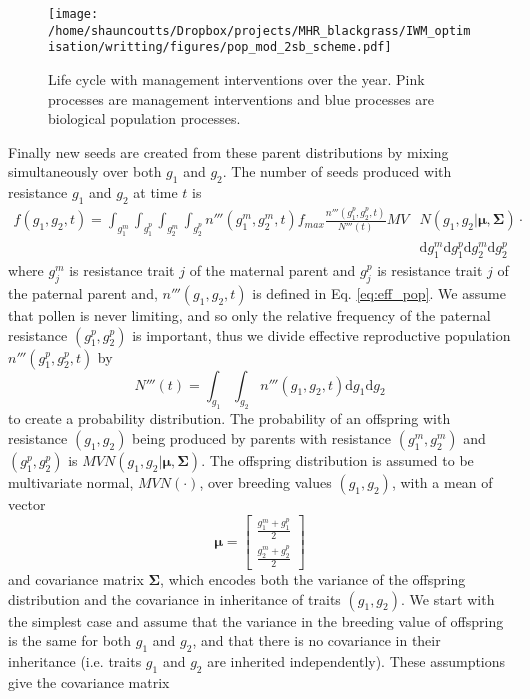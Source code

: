 \documentclass[12pt, a4paper]{article}
\begin{document}
\begin{figure}[H]
\texttt{[image: /home/shauncoutts/Dropbox/projects/MHR\_blackgrass/IWM\_optimisation/writting/figures/pop\_mod\_2sb\_scheme.pdf]}
\caption{Life cycle with management interventions over the year. Pink processes are management interventions and blue processes are biological population processes.}
\label{fig:life_cyc}
\end{figure} 

Finally new seeds are created from these parent distributions by mixing simultaneously over both $g_1$ and $g_2$. The number of seeds produced with resistance $g_1$ and $g_2$ at time $t$ is 
\begin{equation}
\label{eq:fec}
\begin{split}
	f(g_1, g_2, t) = \int_{g_1^m}\int_{g_1^p}\int_{g_2^m}\int_{g_2^p} n'''(g_1^m, g_2^m, t)f_{max} \frac{n'''(g_1^p, g_2^p, t)}{N'''(t)}MV&N(g_1, g_2| \mathbf{\mu}, \mathbf{\Sigma})\cdot\\ &\text{d}g_1^m\text{d}g_1^p\text{d}g_2^m\text{d}g_2^p
\end{split}	
\end{equation} 
where $g_j^m$ is resistance trait $j$ of the maternal parent and $g_j^p$ is resistance trait $j$ of the paternal parent and, $n'''(g_1, g_2, t)$ is defined in Eq. \ref{eq:eff_pop}. We assume that pollen is never limiting, and so only the relative frequency of the paternal resistance $(g_1^p, g_2^p)$ is important, thus we divide effective reproductive population $n'''(g_1^p, g_2^p, t)$ by
\begin{equation}\label{eq:tot_pop3}
	N'''(t) = \int_{g_1}\int_{g_2} n'''(g_1, g_2, t) \text{d}g_1\text{d}g_2 
\end{equation}  
to create a probability distribution. The probability of an offspring with resistance $(g_1, g_2)$ being produced by parents with resistance $(g_1^m, g_2^m)$ and $(g_1^p, g_2^p)$ is $MVN(g_1, g_2| \mathbf{\mu}, \mathbf{\Sigma})$. The offspring distribution is assumed to be multivariate normal, $MVN(\cdot)$, over breeding values $(g_1, g_2)$, with a mean of vector
\begin{equation*}
	\mathbf{\mu} = \begin{bmatrix}
		\frac{g_1^m + g_1^p}{2}\\
		\frac{g_2^m + g_2^p}{2}
		\end{bmatrix}   
\end{equation*}
and covariance matrix $\mathbf{\Sigma}$, which encodes both the variance of the offspring distribution and the covariance in inheritance of traits $(g_1, g_2)$. We start with the simplest case and assume that the variance in the breeding value of offspring is the same for both $g_1$ and $g_2$, and that there is no covariance in their inheritance (i.e. traits $g_1$ and $g_2$ are inherited independently). These assumptions give the covariance matrix    
\end{document}
